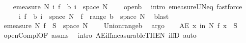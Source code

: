 \begin{isabellebody}
\ \ \isamarkupfalse%
\ {\isachardoublequoteopen}emeasure\ N\ {\isacharparenleft}{\kern0pt}{\isasymUnion}i{\isachardot}{\kern0pt}\ f\ {\isacharminus}{\kern0pt}{\isacharbackquote}{\kern0pt}\ b\ i\ {\isasyminter}\ space\ N{\isacharparenright}{\kern0pt}\ {\isacharequal}{\kern0pt}\ {}{\isachardoublequoteclose}\ \isamarkupfalse%
\ open{\isacharunderscore}{\kern0pt}b\ \isamarkupfalse%
\ {\isacharparenleft}{\kern0pt}intro\ emeasure{\isacharunderscore}{\kern0pt}UN{\isacharunderscore}{\kern0pt}eq{\isacharunderscore}{\kern0pt}{}{\isacharparenright}{\kern0pt}\ fastforce{\isacharplus}{\kern0pt}\isanewline
\ \ \isamarkupfalse%
\ \isamarkupfalse%
\ {\isachardoublequoteopen}{\isacharparenleft}{\kern0pt}{\isasymUnion}i{\isachardot}{\kern0pt}\ f\ {\isacharminus}{\kern0pt}{\isacharbackquote}{\kern0pt}\ b\ i\ {\isasyminter}\ space\ N{\isacharparenright}{\kern0pt}\ {\isacharequal}{\kern0pt}\ f\ {\isacharminus}{\kern0pt}{\isacharbackquote}{\kern0pt}\ {\isacharparenleft}{\kern0pt}{\isasymUnion}{\isacharparenleft}{\kern0pt}range\ b{\isacharparenright}{\kern0pt}{\isacharparenright}{\kern0pt}\ {\isasyminter}\ space\ N{\isachardoublequoteclose}\ \isamarkupfalse%
\ blast\isanewline
\ \ \isamarkupfalse%
\ \isamarkupfalse%
\ {\isachardoublequoteopen}emeasure\ N\ {\isacharparenleft}{\kern0pt}f\ {\isacharminus}{\kern0pt}{\isacharbackquote}{\kern0pt}\ {\isacharparenleft}{\kern0pt}{\isacharminus}{\kern0pt}S{\isacharparenright}{\kern0pt}\ {\isasyminter}\ space\ N{\isacharparenright}{\kern0pt}\ {\isacharequal}{\kern0pt}\ {}{\isachardoublequoteclose}\ \isamarkupfalse%
\ Union{\isacharunderscore}{\kern0pt}range{\isacharunderscore}{\kern0pt}b\ \isamarkupfalse%
\ argo\isanewline
\ \ \isamarkupfalse%
\ {\isachardoublequoteopen}AE\ x\ in\ N{\isachardot}{\kern0pt}\ f\ x\ {\isasymnotin}\ {\isacharminus}{\kern0pt}S{\isachardoublequoteclose}\ \isamarkupfalse%
\ open{\isacharunderscore}{\kern0pt}Compl{\isacharbrackleft}{\kern0pt}OF\ assms{\isacharparenleft}{\kern0pt}{}{\isacharparenright}{\kern0pt}{\isacharbrackright}{\kern0pt}\ \isamarkupfalse%
\ {\isacharparenleft}{\kern0pt}intro\ AE{\isacharunderscore}{\kern0pt}iff{\isacharunderscore}{\kern0pt}measurable{\isacharbrackleft}{\kern0pt}THEN\ iffD{}{\isacharbrackright}{\kern0pt}{\isacharcomma}{\kern0pt}\ auto{\isacharparenright}{\kern0pt}\isanewline
\ \ \isamarkupfalse%

\end{isabellebody}
